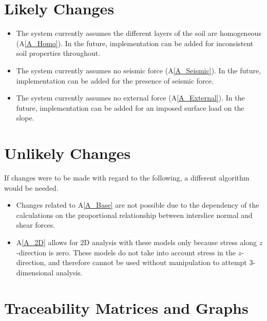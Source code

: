 \documentclass[12pt]{article}
\newcommand{\aref}[1]{A\ref{#1}}
\newcounter{lcnum} %
\newcommand{\lthelcnum}{LC\thelcnum}
\newcounter{ucnum} %
\newcommand{\ltheucnum}{UC\theucnum}
\begin{document}
\section{Likely Changes}

\noindent \begin{itemize}
\item[\refstepcounter{lcnum}\lthelcnum \label{LC_inhomogeneous}:] The system 
currently assumes the different layers of the soil are homogeneous 
(\aref{A_Homo}). In the future, implementation can be added for inconsistent 
soil properties throughout.
 
\item[\refstepcounter{lcnum}\lthelcnum \label{LC_Seismic}:] The system 
currently assumes no seismic force (\aref{A_Seismic}). In the future, 
implementation can be added for the presence of seismic force.

\item[\refstepcounter{lcnum}\lthelcnum \label{LC_External}:] The system 
currently assumes no external force (\aref{A_External}).
In the future, implementation can be added for an imposed surface load on the 
slope.
\end{itemize}

\section{Unlikely Changes}
If changes were to be made with regard to the following,
a different algorithm would be needed.

\begin{itemize}
\item[\refstepcounter{ucnum}\ltheucnum \label{UC_insf}:] Changes related to 
\aref{A_Base} are not possible due to the dependency of the calculations on the 
proportional relationship between interslice normal and shear forces.
\item[\refstepcounter{ucnum}\ltheucnum \label{UC_inhomogeneous}:] \aref{A_2D} 
allows for 2D analysis with these models only because stress along 
$z$-direction is zero. These models do not take into account stress in the 
$z$-direction, and therefore cannot be used without manipulation to attempt 
3-dimensional analysis.
\end{itemize}


\section{Traceability Matrices and Graphs}
\end{document}
